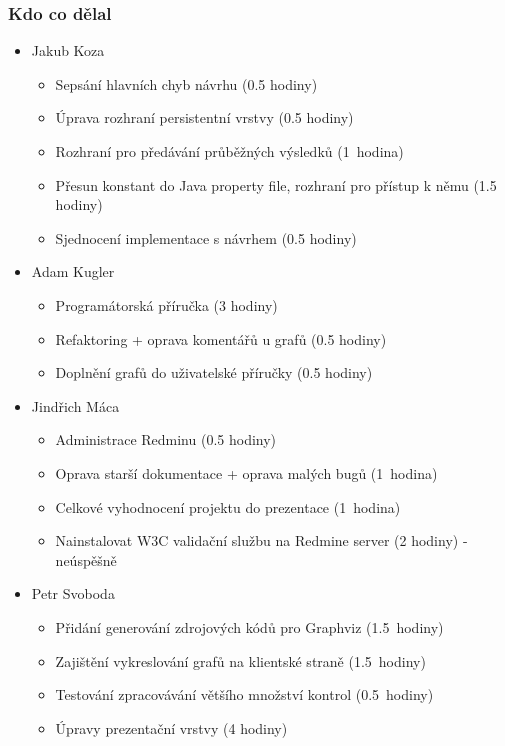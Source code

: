 \documentclass{beamer}
\begin{document}
\begin{frame}[allowframebreaks]\frametitle{Kdo co dělal} 
  \begin{itemize}
    \item Jakub Koza
      \begin{itemize}
       \item Sepsání hlavních chyb návrhu (0.5 hodiny)
			 \item Úprava rozhraní persistentní vrstvy (0.5 hodiny)
			 \item Rozhraní pro předávání průběžných výsledků (1~hodina)
       \item Přesun konstant do Java property file, rozhraní pro přístup k němu (1.5 hodiny)
			 \item Sjednocení implementace s návrhem (0.5 hodiny)
     \end{itemize}

    \item Adam Kugler
      \begin{itemize}
       \item Programátorská příručka (3 hodiny)
       \item Refaktoring + oprava komentářů u grafů (0.5 hodiny)
       \item Doplnění grafů do uživatelské příručky (0.5 hodiny)
     \end{itemize}

    \item Jindřich Máca
      \begin{itemize}
       \item Administrace Redminu	(0.5 hodiny)	
			 \item Oprava starší dokumentace + oprava malých bugů (1~hodina)
			 \item Celkové vyhodnocení projektu do prezentace (1~hodina)
			 \item Nainstalovat W3C validační službu na Redmine server (2 hodiny) - neúspěšně
     \end{itemize}

    \item Petr Svoboda
      \begin{itemize}
			 \item Přidání generování zdrojových kódů pro Graphviz (1.5~hodiny)
			 \item Zajištění vykreslování grafů na klientské straně (1.5~hodiny)
			 \item Testování zpracovávání většího množství kontrol (0.5~hodiny)
			 \item Úpravy prezentační vrstvy (4 hodiny)
     \end{itemize}
   \end{itemize}  
\end{frame} 
\end{document}
